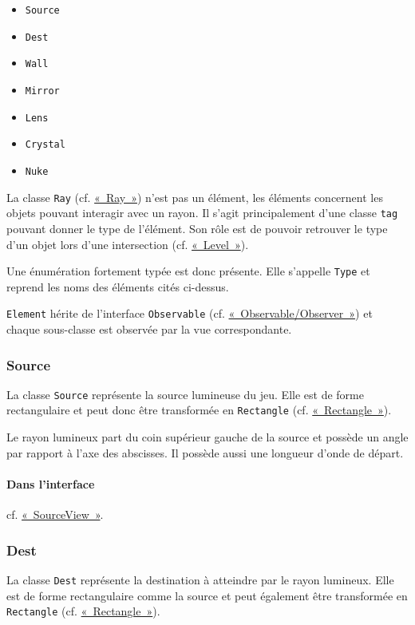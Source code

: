 \documentclass[]{report}
\begin{document}
\begin{itemize}
    \item \texttt{Source}
    \item \texttt{Dest}
    \item \texttt{Wall}
    \item \texttt{Mirror}
    \item \texttt{Lens}
    \item \texttt{Crystal}
    \item \texttt{Nuke}
\end{itemize}

La classe \texttt{Ray} (cf. \hyperref[Ray]{«~Ray~»}) n’est pas un élément, les éléments concernent 
les objets pouvant interagir avec un rayon.
Il s'agit principalement d'une classe \texttt{tag} pouvant
donner le type de l'élément. Son rôle est de pouvoir retrouver
le type d'un objet lors d'une intersection (cf. \hyperref[Level]{«~Level~»}).

Une énumération fortement typée est donc présente. Elle s'appelle
\texttt{Type} et reprend les noms des éléments cités ci-dessus.

\texttt{Element} hérite de l'interface \texttt{Observable} (cf. \hyperref[OO]{«~Observable/Observer~»}) et chaque
sous-classe est observée par la vue correspondante.
    
\subsubsection{\label{Source}Source}

La classe \texttt{Source} représente la source lumineuse du jeu.
Elle est de forme rectangulaire et peut donc être transformée
en \texttt{Rectangle} (cf. \hyperref[Rectangle]{«~Rectangle~»}).

Le rayon lumineux part du coin supérieur gauche de la source et possède
un angle par rapport à l'axe des abscisses. Il possède aussi une longueur
d'onde de départ.

\paragraph{Dans l'interface} cf. \hyperref[SourceView]{«~SourceView~»}.

\subsubsection{\label{Dest}Dest}

La classe \texttt{Dest} représente la destination à atteindre par 
le rayon lumineux. Elle est de forme rectangulaire comme la source
et peut également être transformée en \texttt{Rectangle} (cf. \hyperref[Rectangle]{«~Rectangle~»}).
\end{document}
